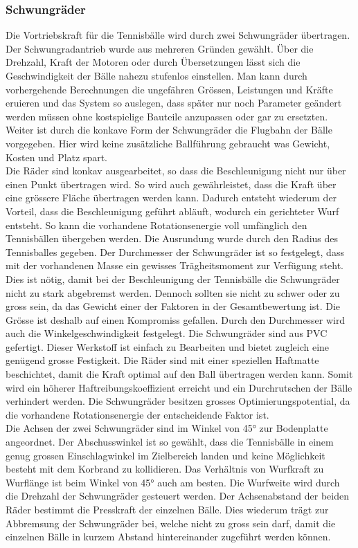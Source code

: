 \subsubsection{Schwungräder}
Die Vortriebskraft für die Tennisbälle wird durch zwei Schwungräder übertragen. Der Schwungradantrieb wurde aus mehreren Gründen gewählt. Über die Drehzahl, Kraft der Motoren oder durch Übersetzungen lässt sich die Geschwindigkeit der Bälle nahezu stufenlos einstellen. Man kann durch vorhergehende Berechnungen die ungefähren Grössen, Leistungen und Kräfte eruieren und das System so auslegen, dass später nur noch Parameter geändert werden müssen ohne kostspielige Bauteile anzupassen oder gar zu ersetzten. Weiter ist durch die konkave Form der Schwungräder die Flugbahn der Bälle vorgegeben. Hier wird keine zusätzliche Ballführung gebraucht was Gewicht, Kosten und Platz spart. \\
Die Räder sind konkav ausgearbeitet, so dass die Beschleunigung nicht nur über einen Punkt übertragen wird. So wird auch gewährleistet, dass die Kraft über eine grössere Fläche übertragen werden kann. Dadurch entsteht wiederum der Vorteil, dass die Beschleunigung geführt abläuft, wodurch ein gerichteter Wurf entsteht. So kann die vorhandene Rotationsenergie voll umfänglich den Tennisbällen übergeben werden. Die Ausrundung wurde durch den Radius des Tennisballes gegeben. Der Durchmesser der Schwungräder ist so festgelegt, dass mit der vorhandenen Masse ein gewisses Trägheitsmoment zur Verfügung steht. Dies ist nötig, damit bei der Beschleunigung der Tennisbälle die Schwungräder nicht zu stark abgebremst werden. Dennoch sollten sie nicht zu schwer oder zu gross sein, da das Gewicht einer der Faktoren in der Gesamtbewertung ist. Die Grösse ist deshalb auf einen Kompromiss gefallen. Durch den Durchmesser wird auch die Winkelgeschwindigkeit festgelegt. Die Schwungräder sind aus PVC gefertigt. Dieser Werkstoff ist einfach zu Bearbeiten und bietet zugleich eine genügend grosse Festigkeit. Die Räder sind mit einer speziellen Haftmatte beschichtet, damit die Kraft optimal auf den Ball übertragen werden kann. Somit wird ein höherer Haftreibungskoeffizient erreicht und ein Durchrutschen der Bälle verhindert werden. Die Schwungräder besitzen grosses Optimierungspotential, da die vorhandene Rotationsenergie der entscheidende Faktor ist.\\
Die Achsen der zwei Schwungräder sind im Winkel von 45° zur Bodenplatte angeordnet. Der Abschusswinkel ist so gewählt, dass die Tennisbälle in einem genug grossen Einschlagwinkel im Zielbereich landen und keine Möglichkeit besteht mit dem Korbrand zu kollidieren. Das Verhältnis von Wurfkraft zu Wurflänge ist beim Winkel von 45° auch am besten. Die Wurfweite wird durch die Drehzahl der Schwungräder gesteuert werden. Der Achsenabstand der beiden Räder bestimmt die Presskraft der einzelnen Bälle. Dies wiederum trägt zur Abbremsung der Schwungräder bei, welche nicht zu gross sein darf, damit die einzelnen Bälle in kurzem Abstand hintereinander zugeführt werden können. 
